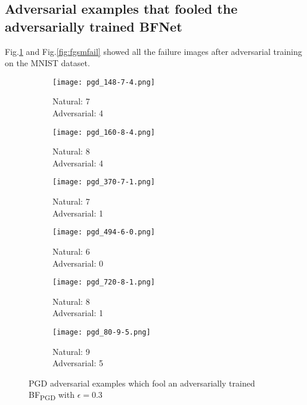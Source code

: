 \documentclass{article} %
\begin{document}
\subsection{Adversarial examples that fooled the adversarially trained BFNet}
Fig.\ref{fig:pgdfail} and Fig.\ref{fig:fgsmfail} showed all the failure images after adversarial training on the MNIST dataset.
\begin{figure}[htb]
\centering
\captionsetup[subfigure]{labelformat=empty}
\begin{subfigure}{.3\textwidth}
  \centering
  \texttt{[image: pgd\_148-7-4.png]}
  \caption{Natural: 7\\Adversarial: 4}
\end{subfigure}%
\begin{subfigure}{.3\textwidth}
  \centering
  \texttt{[image: pgd\_160-8-4.png]}
  \caption{Natural: 8\\Adversarial: 4}
\end{subfigure}
\begin{subfigure}{.3\textwidth}
  \centering
  \texttt{[image: pgd\_370-7-1.png]}
  \caption{Natural: 7\\Adversarial: 1}
\end{subfigure}
\begin{subfigure}{.3\textwidth}
  \centering
  \texttt{[image: pgd\_494-6-0.png]}
  \caption{Natural: 6\\Adversarial: 0}
\end{subfigure}
\begin{subfigure}{.3\textwidth}
  \centering
  \texttt{[image: pgd\_720-8-1.png]}
  \caption{Natural: 8\\Adversarial: 1}
\end{subfigure}
\begin{subfigure}{.3\textwidth}
  \centering
  \texttt{[image: pgd\_80-9-5.png]}
  \caption{Natural: 9\\Adversarial: 5}
\end{subfigure}
\caption{PGD adversarial examples which fool an adversarially trained BF\textsubscript{PGD} with $\epsilon = 0.3$}
\label{fig:pgdfail}
\end{figure}
\end{document}
